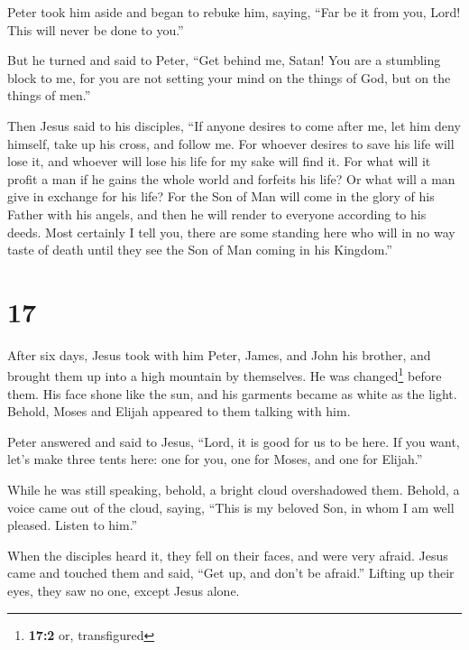  Peter took him aside and began to rebuke him, saying,
``Far be it from you, Lord! This will never be done to you.''

 But he turned and said to Peter, ``Get behind me, Satan!
You are a stumbling block to me, for you are not setting your mind on
the things of God, but on the things of men.''

 Then Jesus said to his disciples, ``If anyone desires to
come after me, let him deny himself, take up his cross, and follow me.
 For whoever desires to save his life will lose it, and
whoever will lose his life for my sake will find it.  For
what will it profit a man if he gains the whole world and forfeits his
life? Or what will a man give in exchange for his life? 
For the Son of Man will come in the glory of his Father with his angels,
and then he will render to everyone according to his deeds.
 Most certainly I tell you, there are some standing here
who will in no way taste of death until they see the Son of Man coming
in his Kingdom.''

\hypertarget{section-16}{%
\section{17}\label{section-16}}

 After six days, Jesus took with him Peter, James, and
John his brother, and brought them up into a high mountain by
themselves.  He was changed\footnote{\textbf{17:2} or,
  transfigured} before them. His face shone like the sun, and his
garments became as white as the light.  Behold, Moses and
Elijah appeared to them talking with him.

 Peter answered and said to Jesus, ``Lord, it is good for
us to be here. If you want, let's make three tents here: one for you,
one for Moses, and one for Elijah.''

 While he was still speaking, behold, a bright cloud
overshadowed them. Behold, a voice came out of the cloud, saying, ``This
is my beloved Son, in whom I am well pleased. Listen to him.''

 When the disciples heard it, they fell on their faces,
and were very afraid.  Jesus came and touched them and
said, ``Get up, and don't be afraid.''  Lifting up their
eyes, they saw no one, except Jesus alone.

